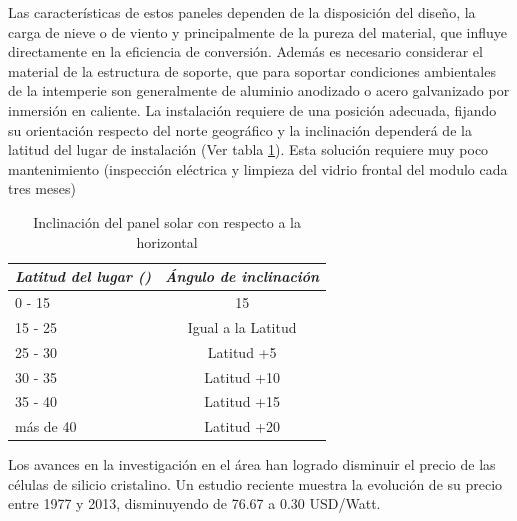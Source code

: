 Las características de estos paneles dependen de la disposición del diseño, la carga de nieve o de viento y principalmente de la pureza del material, que influye directamente en la eficiencia de conversión. Además es necesario considerar el material de la estructura de soporte, que para soportar condiciones ambientales de la intemperie son generalmente de aluminio anodizado o acero galvanizado por inmersión en caliente. La instalación requiere de una posición adecuada, fijando su orientación respecto del norte geográfico y la inclinación dependerá de la latitud del lugar de instalación (Ver tabla \ref{tab:inclina}). Esta solución requiere muy poco mantenimiento (inspección eléctrica y limpieza del vidrio frontal del modulo cada tres meses)

\begin{table}[ht]
	\centering
	\caption{Inclinación del panel solar con respecto a la horizontal}
	\begin{tabular}{@{} l *1c @{}}    \toprule
		\emph{\textbf{Latitud del lugar (\grados)}} & \emph{\textbf{Ángulo de inclinación}}\\
		\midrule
		0 - 15	& 15\grados	\\	
		15 - 25 	& Igual a la Latitud\\
		25 - 30	& Latitud +5\grados\\
		30 - 35	& Latitud +10\grados\\
		35 - 40	& Latitud +15\grados\\
		más de 40	& Latitud +20\grados\\
		\bottomrule
		\hline
	\end{tabular}
	\label{tab:inclina}
\end{table}

Los avances en la investigación en el área han logrado disminuir el precio de las células de silicio cristalino. Un estudio reciente \citep{Bloomberg} muestra la evolución de su precio entre 1977 y 2013, disminuyendo de 76.67 a 0.30 USD/Watt.



